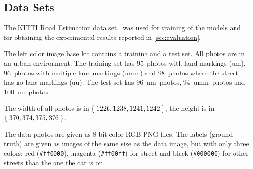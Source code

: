 
\subsection{Data Sets}\label{sec:datasets}
The KITTI Road Estimation data set~\cite{Fritsch2013} was used for training of
the models and for obtaining the experimental results reported in
\cref{sec:evaluation}.

The left color image base kit contains a training and a test set. All photos
are in an urban environment. The training set has 95~photos with land markings
(um), 96~photos with multiple lane markings (umm) and 98~photos where the
street has no lane markings (uu). The test set has 96~um~photos, 94~umm~photos
and 100~uu~photos.

The width of all photos is in $\Set{1226, 1238, 1241, 1242}$, the height is in
$\Set{370, 374, 375, 376}$.

The data photos are given as 8-bit color RGB PNG files. The labels (ground
truth) are given as images of the same size as the data image, but with only
three colors: red (\verb+#ff0000+), magenta (\verb+#ff00ff+) for street and
black (\verb+#000000+) for other streets than the one the car is on.